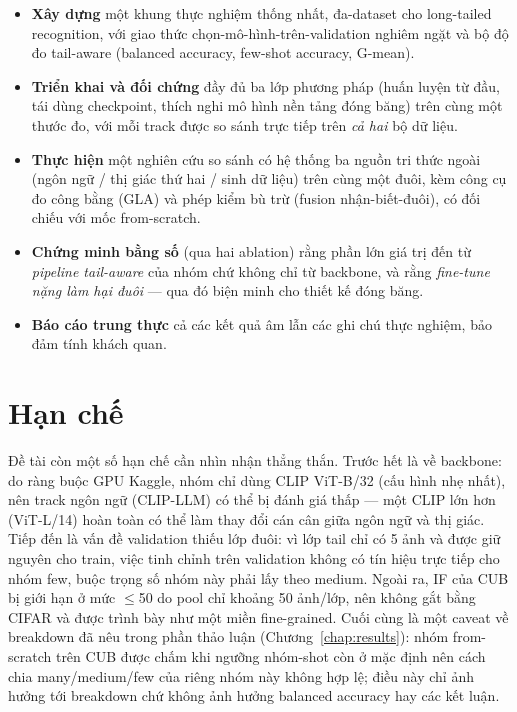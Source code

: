 \begin{itemize}
  \item \textbf{Xây dựng} một khung thực nghiệm thống nhất, đa-dataset cho long-tailed recognition,
        với giao thức chọn-mô-hình-trên-validation nghiêm ngặt và bộ độ đo tail-aware (balanced
        accuracy, few-shot accuracy, G-mean).
  \item \textbf{Triển khai và đối chứng} đầy đủ ba lớp phương pháp (huấn luyện từ đầu, tái dùng
        checkpoint, thích nghi mô hình nền tảng đóng băng) trên cùng một thước đo, với mỗi track được
        so sánh trực tiếp trên \emph{cả hai} bộ dữ liệu.
  \item \textbf{Thực hiện} một nghiên cứu so sánh có hệ thống ba nguồn tri thức ngoài (ngôn ngữ /
        thị giác thứ hai / sinh dữ liệu) trên cùng một đuôi, kèm công cụ đo công bằng (GLA) và phép
        kiểm bù trừ (fusion nhận-biết-đuôi), có đối chiếu với mốc from-scratch.
  \item \textbf{Chứng minh bằng số} (qua hai ablation) rằng phần lớn giá trị đến từ \emph{pipeline
        tail-aware} của nhóm chứ không chỉ từ backbone, và rằng \emph{fine-tune nặng làm hại đuôi}
        --- qua đó biện minh cho thiết kế đóng băng.
  \item \textbf{Báo cáo trung thực} cả các kết quả âm lẫn các ghi chú thực nghiệm, bảo đảm tính khách
        quan.
\end{itemize}

\section{Hạn chế}

Đề tài còn một số hạn chế cần nhìn nhận thẳng thắn. Trước hết là về backbone: do ràng buộc GPU
Kaggle, nhóm chỉ dùng CLIP ViT-B/32 (cấu hình nhẹ nhất), nên track ngôn ngữ (CLIP-LLM) có thể bị
đánh giá thấp --- một CLIP lớn hơn (ViT-L/14) hoàn toàn có thể làm thay đổi cán cân giữa ngôn ngữ và
thị giác. Tiếp đến là vấn đề validation thiếu lớp đuôi: vì lớp tail chỉ có 5 ảnh và được giữ nguyên
cho train, việc tinh chỉnh trên validation không có tín hiệu trực tiếp cho nhóm few, buộc trọng số
nhóm này phải lấy theo medium. Ngoài ra, IF của CUB bị giới hạn ở mức $\le$50 do pool chỉ khoảng 50
ảnh/lớp, nên không gắt bằng CIFAR và được trình bày như một miền fine-grained. Cuối cùng là một
caveat về breakdown đã nêu trong phần thảo luận (Chương~\ref{chap:results}): nhóm from-scratch trên
CUB được chấm khi ngưỡng nhóm-shot còn ở mặc định nên cách chia many/medium/few của riêng nhóm này
không hợp lệ; điều này chỉ ảnh hưởng tới breakdown chứ không ảnh hưởng balanced accuracy hay các kết
luận.

